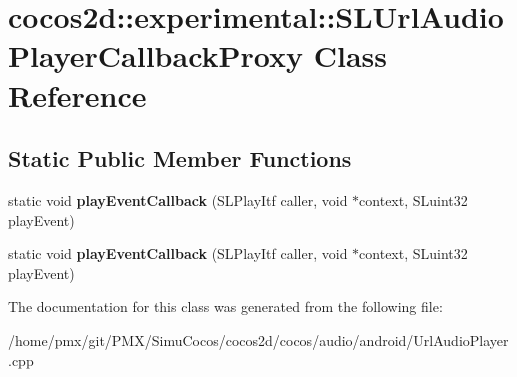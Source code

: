 \hypertarget{classcocos2d_1_1experimental_1_1SLUrlAudioPlayerCallbackProxy}{}\section{cocos2d\+:\+:experimental\+:\+:S\+L\+Url\+Audio\+Player\+Callback\+Proxy Class Reference}
\label{classcocos2d_1_1experimental_1_1SLUrlAudioPlayerCallbackProxy}
\subsection*{Static Public Member Functions}
\begin{DoxyCompactItemize}
\item 
\mbox{\label{classcocos2d_1_1experimental_1_1SLUrlAudioPlayerCallbackProxy_a57fe1ff9a33fca7a88dcd5bf880d90ad}} 
static void {\bfseries play\+Event\+Callback} (S\+L\+Play\+Itf caller, void $\ast$context, S\+Luint32 play\+Event)
\item 
\mbox{\label{classcocos2d_1_1experimental_1_1SLUrlAudioPlayerCallbackProxy_a57fe1ff9a33fca7a88dcd5bf880d90ad}} 
static void {\bfseries play\+Event\+Callback} (S\+L\+Play\+Itf caller, void $\ast$context, S\+Luint32 play\+Event)
\end{DoxyCompactItemize}


The documentation for this class was generated from the following file\+:\begin{DoxyCompactItemize}
\item 
/home/pmx/git/\+P\+M\+X/\+Simu\+Cocos/cocos2d/cocos/audio/android/Url\+Audio\+Player.\+cpp\end{DoxyCompactItemize}
